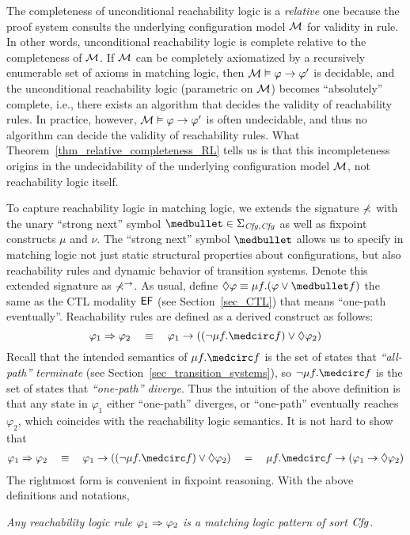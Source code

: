 \documentclass{amsart}
\begin{document}
The completeness of unconditional reachability logic
is a \emph{relative} one 
because the proof system consults the underlying configuration model $\mathcal{M}$
for validity in  rule.
In other words, unconditional reachability logic is complete
relative to the completeness of $\mathcal{M}$.
If $\mathcal{M}$ can be completely axiomatized by a recursively enumerable
set of axioms in matching logic,
then $\mathcal{M} \vDash \varphi \to \varphi'$ is decidable,
and the unconditional reachability logic 
(parametric on $\mathcal{M}$) becomes ``absolutely'' complete, i.e.,
there exists an algorithm that decides the validity of 
reachability rules.
In practice, however, $\mathcal{M} \vDash \varphi \to \varphi'$ is often undecidable,
and thus no algorithm can decide the validity of reachability rules.
What Theorem~\ref{thm_relative_completeness_RL} tells us is that
this incompleteness origins in the undecidability of the underlying
configuration model $\mathcal{M}$, not reachability logic itself.

To capture reachability logic in matching logic, we extends the signature $\mathbb{\Sigma}$
with the unary ``strong next'' symbol $\snext \in \Sigma_{\Cfg,\Cfg}$ 
as well as fixpoint constructs $\mu$ and $\nu$.
The ``strong next'' symbol $\snext$ allows us to specify in matching logic
not just static structural properties about configurations,
but also reachability rules and dynamic behavior of
transition systems.
Denote this extended signature as $\mathbb{\Sigma}^\to$.
As usual, define $\eventually \varphi \equiv \mu f . (\varphi \vee \snext f)$
the same as the CTL modality ${\mathsf{EF}}$ (see Section~\ref{sec_CTL})
that means ``one-path eventually''.
Reachability rules are defined as a derived construct as follows:
$$
\varphi_1 \To \varphi_2 \quad\equiv\quad
\varphi_1 \imp ((\neg \mu f . \wnext f) \vee \eventually \varphi_2)
$$
Recall that the intended semantics of 
$\mu f . \wnext f$ is the set of states that \emph{``all-path'' terminate}
(see Section~\ref{sec_transition_systems}),
so $\neg \mu f . \wnext f$ is the set of states that 
\emph{``one-path'' diverge}.
Thus the intuition of the above definition is that
any state in $\varphi_1$ either ``one-path'' diverges, or 
``one-path'' eventually reaches $\varphi_2$,
which coincides with the reachability logic semantics.
It is not hard to show that
\begin{align*}
\varphi_1 \To \varphi_2 \quad\equiv\quad
\varphi_1 \imp ((\neg \mu f . \wnext f) \vee \eventually \varphi_2)
\quad=\quad \mu f . \wnext f \imp (\varphi_1 \imp \eventually \varphi_2)
\end{align*}
The rightmost form is convenient in fixpoint reasoning.
With the above definitions and notations,
\begin{center}
\em
Any reachability logic rule $\varphi_1 \Rightarrow \varphi_2$
is a matching logic pattern of sort $\mathit{Cfg}$.
\end{center}
\end{document}
